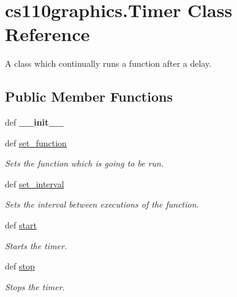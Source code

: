 \hypertarget{classcs110graphics_1_1Timer}{
\section{cs110graphics.Timer Class Reference}
\label{classcs110graphics_1_1Timer}
}


A class which continually runs a function after a delay.  
\subsection*{Public Member Functions}
\begin{DoxyCompactItemize}
\item 
\hypertarget{classcs110graphics_1_1Timer_a7d40cc83eb4083d4afd97c3ce5279e1a}{
def {\bfseries \_\-\_\-init\_\-\_\-}}
\label{classcs110graphics_1_1Timer_a7d40cc83eb4083d4afd97c3ce5279e1a}

\item 
def \hyperlink{classcs110graphics_1_1Timer_aba0aae9c8bfff7c626112f0020383a8d}{set\_\-function}
\begin{DoxyCompactList}\small\item\em Sets the function which is going to be run. \item\end{DoxyCompactList}\item 
def \hyperlink{classcs110graphics_1_1Timer_ae176b030095b0d96fa0e91f2c398c40a}{set\_\-interval}
\begin{DoxyCompactList}\small\item\em Sets the interval between executions of the function. \item\end{DoxyCompactList}\item 
def \hyperlink{classcs110graphics_1_1Timer_afe14c3fd66571d0186a54a4075f31b7e}{start}
\begin{DoxyCompactList}\small\item\em Starts the timer. \item\end{DoxyCompactList}\item 
def \hyperlink{classcs110graphics_1_1Timer_a26ae5eb7c7da929f7e2b6e17e4b709b1}{stop}
\begin{DoxyCompactList}\small\item\em Stops the timer. \item\end{DoxyCompactList}\end{DoxyCompactItemize}


